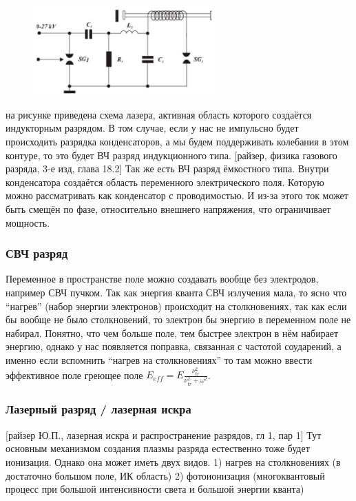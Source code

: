 \documentclass[10pt, a4paper]{article}
\begin{document}
\begin{figure}[h!]
	\begin{center}
		\includegraphics[width=70mm]{12.5.jpg}
	\end{center}
\end{figure}

на рисунке приведена схема лазера, активная область которого создаётся индукторным разрядом.
В том случае, если у нас не импульсно будет происходить разрядка конденсаторов, а мы будем поддерживать колебания в этом контуре, то это будет ВЧ разряд индукционного типа.
[райзер, физика газового разряда, 3-е изд, глава 18.2]
Так же есть ВЧ разряд ёмкостного типа. Внутри конденсатора создаётся область переменного электрического поля. Которую можно рассматривать как конденсатор с проводимостью. И из-за этого ток может быть смещён по фазе, относительно внешнего напряжения, что ограничивает мощность.
\subsubsection{СВЧ разряд}
Переменное в пространстве поле можно создавать вообще без электродов, например СВЧ пучком. Так как энергия кванта СВЧ излучения мала, то ясно что “нагрев” (набор энергии электронов) происходит на столкновениях,  так как если бы вообще не было столкновений, то электрон бы энергию в переменном поле не набирал. Понятно, что чем больше поле, тем быстрее электрон в нём набирает энергию, однако у нас появляется поправка, связанная с частотой соударений, а именно если вспомнить “нагрев на столкновениях” то там можно ввести эффективное поле греющее поле $E_{eff}=E \frac{\nu_{tr}^{2}}{\nu_{tr}^{2}+\omega^{2}}$. 
\subsubsection{Лазерный разряд / лазерная искра}
[райзер Ю.П., лазерная искра и распространение разрядов, гл 1, пар 1]
Тут основным механизмом создания плазмы разряда естественно тоже будет ионизация. Однако она может иметь двух видов. 1) нагрев на столкновениях (в достаточно большом поле, ИК область) 2) фотоионизация (многоквантовый процесс при большой интенсивности света и большой энергии кванта)
\end{document}
